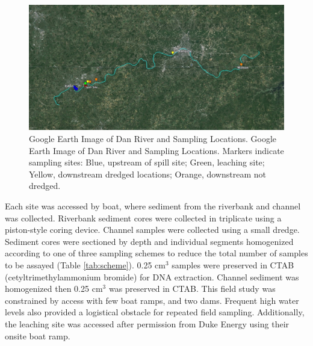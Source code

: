 \documentclass[ms, hidelinks]{uncgdissertationexp3}
\theoremstyle{plain}
\theoremstyle{definition}
\theoremstyle{remark}
\newcommand{\titlecaption}[2]{\caption[#1]{#1. #2}}
\begin{document}
\begin{figure}[htbp]
\centering
\includegraphics[width=375pt]{figure/map}
\titlecaption{Google Earth Image of Dan River and Sampling Locations}{Google Earth Image of Dan River and Sampling Locations. Markers indicate sampling sites: Blue, upstream of spill site; Green, leaching site; Yellow, downstream dredged locations; Orange, downstream not dredged.}
\label{fig:map}
\end{figure}

\FloatBarrier
Each site was accessed by boat, where sediment from the riverbank and channel was collected. Riverbank sediment cores were collected in triplicate using a piston-style coring device. Channel samples were collected using a small dredge. Sediment cores were sectioned by depth and individual segments homogenized according to one of three sampling schemes to reduce the total number of samples to be assayed (Table \ref{tab:scheme}). 0.25 \(\mathrm{cm^3}\) samples were preserved in CTAB (cetyltrimethylammonium bromide) for DNA extraction. Channel sediment was homogenized then 0.25 \(\mathrm{cm^3}\) was preserved in CTAB.
This field study was constrained by access with few boat ramps, and two dams. Frequent high water levels also provided a logistical obstacle for repeated field sampling. Additionally, the leaching site was accessed after permission from Duke Energy using their onsite boat ramp.
\end{document}
